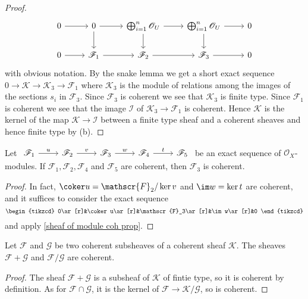 \begin{proof}
\[\begin{tikzcd}
0\ar[r]&0\ar[r]\ar[d]&\bigoplus_{i=1}^{n}\mathscr{O}_U\ar[d]\ar[r]&\bigoplus_{i=1}^{n}\mathscr{O}_U\ar[r]\ar[d]&0\\
0\ar[r]&\mathscr{F}_1\ar[r]&\mathscr{F}_2\ar[r]&\mathscr{F}_3\ar[r]&0
\end{tikzcd}\]
with obvious notation. By the snake lemma we get a short exact sequence $0\to\mathscr{K}\to\mathscr{K}_3\to\mathscr{F}_1$ where $\mathscr{K}_3$ is the module of relations among the images of the sections $s_i$ in $\mathscr{F}_3$. Since $\mathscr{F}_3$ is coherent we see that $\mathscr{K}_3$ is finite type. Since $\mathscr{F}_1$ is coherent we see that the image $\mathscr{I}$ of $\mathscr{K}_3\to\mathscr{F}_1$ is coherent. Hence $\mathscr{K}$ is the kernel of the map $\mathscr{K}\to\mathscr{I}$ between a finite type sheaf and a coherent sheaves and hence finite type by (b).
\end{proof}
\begin{corollary}\label{sheaf of module coh 5 of 4}
Let $\begin{tikzcd}\mathscr{F}_1\ar[r,"u"]&\mathscr{F}_2\ar[r,"v"]&\mathscr{F}_3\ar[r,"w"]&\mathscr{F}_4\ar[r,"t"]&\mathscr{F}_5\end{tikzcd}$ be an exact sequence of $\mathscr{O}_X$-modules. If $\mathscr{F}_1,\mathscr{F}_2,\mathscr{F}_4$ and $\mathscr{F}_5$ are coherent, then $\mathscr{F}_3$ is coherent.
\end{corollary}
\begin{proof}
In fact, $\coker u=\mathscr{F}_2/\ker v$ and $\im w=\ker t$ are coherent, and it suffices to consider the exact sequence
\[\begin{tikzcd}
0\ar[r]&\coker u\ar[r]&\mathscr{F}_3\ar[r]&\im w\ar[r]&0
\end{tikzcd}\]
and apply \cref{sheaf of module coh prop}.
\end{proof}
\begin{corollary}\label{sheaf of module coh sum and quotient}
Let $\mathscr{F}$ and $\mathscr{G}$ be two coherent subsheaves of a coherent sheaf $\mathscr{K}$. The sheaves $\mathscr{F}+\mathscr{G}$ and $\mathscr{F}/\mathscr{G}$ are coherent.
\end{corollary}
\begin{proof}
The sheaf $\mathscr{F}+\mathscr{G}$ is a subsheaf of $\mathscr{K}$ of fintie type, so it is coherent by definition. As for $\mathscr{F}\cap\mathscr{G}$, it is the kernel of $\mathscr{F}\to\mathscr{K}/\mathscr{G}$, so is coherent.
\end{proof}
